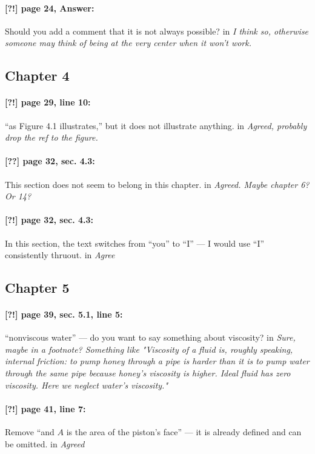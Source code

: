 \documentclass[twoside]{article}
\begin{document}
\paragraph{[?!] page 24, Answer:} Should you add a comment that it is not always possible?
 in {\it  I think so, otherwise someone may think of being at the very center when it won't work. } 

\subsection*{Chapter 4}

\paragraph{[?!] page 29, line 10:} “as Figure 4.1 illustrates,” but it does not illustrate anything.
 in
{\it  Agreed, probably drop the ref to the figure.}

\paragraph{[??] page 32, sec. 4.3:}
This section does not seem to belong in this chapter.
 in
{\it  Agreed. Maybe chapter 6? Or 14?}

\paragraph{[?!] page 32, sec. 4.3:}
In this section, the text switches from “you” to “I” — I would use “I” consistently thruout.
 in {\it Agree } 

\subsection*{Chapter 5}

\paragraph{[?!] page 39, sec. 5.1, line 5:}
“nonviscous water” — do you want to say something about viscosity?
 in {\it Sure, maybe in a footnote? Something like "Viscosity of a fluid is, roughly speaking, internal friction: to pump honey through a pipe is harder than it is to pump water through the same pipe because honey's viscosity is higher. Ideal fluid has zero viscosity. Here we neglect water's viscosity."} 

\paragraph{[?!] page 41, line 7:}
Remove “and $A$ is the area of the piston’s face” — it is already defined and can be omitted.
 in {\it  Agreed} 
\end{document}
